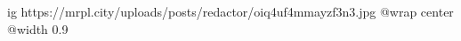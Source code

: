  
 
 
 
 

\ifcmt
  ig https://mrpl.city/uploads/posts/redactor/oiq4uf4mmayzf3n3.jpg
  @wrap center
  @width 0.9
\fi
